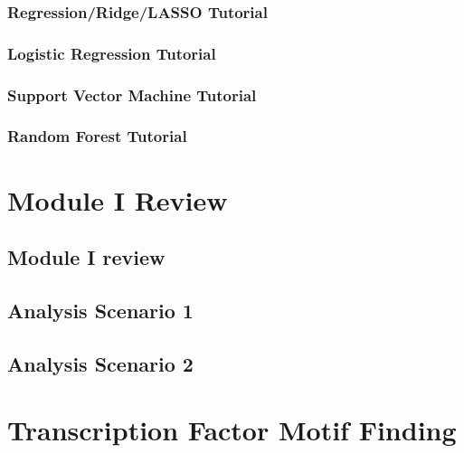 \documentclass[
]{book}
\begin{document}
\hypertarget{regressionridgelasso-tutorial}{%
\subsection{Regression/Ridge/LASSO Tutorial}\label{regressionridgelasso-tutorial}}

\hypertarget{logistic-regression-tutorial}{%
\subsection{Logistic Regression Tutorial}\label{logistic-regression-tutorial}}

\hypertarget{support-vector-machine-tutorial}{%
\subsection{Support Vector Machine Tutorial}\label{support-vector-machine-tutorial}}

\hypertarget{random-forest-tutorial}{%
\subsection{Random Forest Tutorial}\label{random-forest-tutorial}}

\hypertarget{m1re}{%
\chapter{Module I Review}\label{m1re}}

\hypertarget{module-i-review}{%
\section{Module I review}\label{module-i-review}}

\hypertarget{analysis-scenario-1}{%
\section{Analysis Scenario 1}\label{analysis-scenario-1}}

\hypertarget{analysis-scenario-2}{%
\section{Analysis Scenario 2}\label{analysis-scenario-2}}

\hypertarget{tfmf}{%
\chapter{Transcription Factor Motif Finding}\label{tfmf}}
\end{document}
